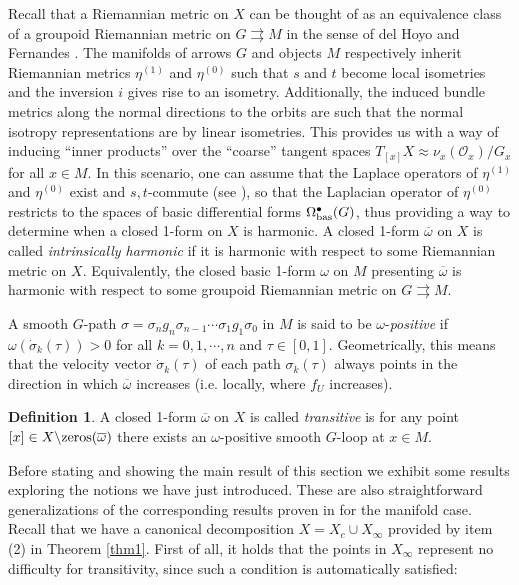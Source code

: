 \documentclass[
  a4paper, 
  reqno, 
  oneside, 
  12pt
]{amsart}
\theoremstyle{definition}
\newtheorem{definition}[theorem]{Definition}
\theoremstyle{remark}
\newcommand{\rr}{\rightrightarrows}
\begin{document}
Recall that a Riemannian metric on $X$ can be thought of as an equivalence class of a groupoid Riemannian metric on $G\rr M$ in the sense of del Hoyo and Fernandes \cite{dHF,dHF2}. The manifolds of arrows $G$ and objects $M$ respectively inherit Riemannian metrics $\eta^{(1)}$ and $\eta^{(0)}$ such that $s$ and $t$ become local isometries and the inversion $i$ gives rise to an isometry. Additionally, the induced bundle metrics along the normal directions to the orbits are such that the normal isotropy representations are by linear isometries. This provides us with a way of inducing ``inner products'' over the ``coarse'' tangent spaces $T_{[x]} X \approx \nu_x(\mathcal{O}_x)/G_x$ for all $x\in M$. In this scenario, one can assume that the Laplace operators of $\eta^{(1)}$ and $\eta^{(0)}$ exist and $s, t$-commute (see \cite{BBB,Watson}), so that the Laplacian operator of $\eta^{(0)}$ restricts to the spaces of basic differential forms $\Omega_{\textnormal{bas}}^\bullet(G)$, thus providing a way to determine when a closed 1-form on $X$ is harmonic. A closed 1-form $\overline{\omega}$ on $X$ is called \emph{intrinsically harmonic} if it is harmonic with respect to some Riemannian metric on $X$. Equivalently, the closed basic 1-form $\omega$ on $M$ presenting $\overline{\omega}$ is harmonic with respect to some groupoid Riemannian metric on $G\rr M$.

A smooth $G$-path $\sigma=\sigma_ng_n\sigma_{n-1}\cdots \sigma_1g_1\sigma_0$ in $M$ is said to be $\omega$-\emph{positive} if $\omega(\dot{\sigma}_k(\tau))>0$ for all $k=0,1,\cdots,n$ and $\tau\in [0,1]$. Geometrically, this means that the velocity vector $\dot{\sigma}_k(\tau)$ of each path $\sigma_k(\tau)$ always points in the direction in which $\overline{\omega}$ increases (i.e. locally, where $f_U$ increases).


\begin{definition}
A closed 1-form $\overline{\omega}$ on $X$ is called \emph{transitive} is for any point $[x]\in X\backslash \textnormal{zeros}(\overline{\omega})$ there exists an $\omega$-positive smooth $G$-loop at $x\in M$. 
\end{definition}

Before stating and showing the main result of this section we exhibit some results exploring the notions we have just introduced. These are also straightforward generalizations of the corresponding results proven in \cite{FKL} for the manifold case. Recall that we have a canonical decomposition $X= X_c\cup X_\infty$ provided by item (2) in Theorem \ref{thm1}. First of all, it holds that the points in $X_\infty$ represent no difficulty for transitivity, since such a condition is automatically satisfied: 
\end{document}
